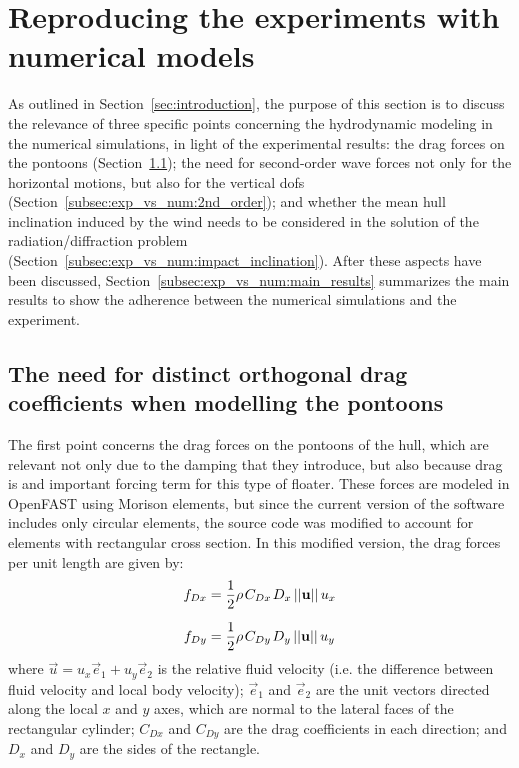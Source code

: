 \section{Reproducing the experiments with numerical models} \label{sec:exp_vs_num}
As outlined in Section~\ref{sec:introduction}, the purpose of this section is to discuss the relevance of three specific points concerning the hydrodynamic modeling in the numerical simulations, in light of the experimental results: the drag forces on the pontoons (Section~\ref{subsec:exp_vs_num:drag}); the need for second-order wave forces not only for the horizontal motions, but also for the vertical dofs (Section~\ref{subsec:exp_vs_num:2nd_order}); and whether the mean hull inclination induced by the wind needs to be considered in the solution of the radiation/diffraction problem (Section~\ref{subsec:exp_vs_num:impact_inclination}). After these aspects have been discussed, Section~\ref{subsec:exp_vs_num:main_results} summarizes the main results to show the adherence between the numerical simulations and the experiment.


\subsection{The need for distinct orthogonal drag coefficients when modelling the pontoons} \label{subsec:exp_vs_num:drag}
The first point concerns the drag forces on the pontoons of the hull, which are relevant not only due to the damping that they introduce, but also because drag is and important forcing term for this type of floater. These forces are modeled in OpenFAST using Morison elements, but since the current version of the software includes only circular elements, the source code was modified to account for elements with rectangular cross section. In this modified version, the drag forces per unit length are given by:
\begin{equation}
\begin{split}
	f_{Dx} &= \frac{1}{2} \rho \mkern2mu C_{Dx} \mkern2mu D_x \,||\vec{u}|| \, u_x \\[6pt]
	f_{Dy} &= \frac{1}{2} \rho \mkern2mu C_{Dy} \mkern2mu D_y \,||\vec{u}|| \, u_y
\end{split}		
\end{equation}
%
where $\vec{u}=u_x\vec{e}_1+u_y\vec{e}_2$ is the relative fluid velocity (i.e. the difference between fluid velocity and local body velocity); $\vec{e}_1$ and $\vec{e}_2$ are the unit vectors directed along the local $x$ and $y$ axes, which are normal to the lateral faces of the rectangular cylinder; $C_{Dx}$ and $C_{Dy}$ are the drag coefficients in each direction; and $D_x$ and $D_y$ are the sides of the rectangle.

